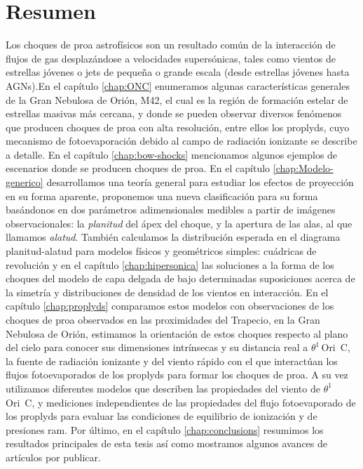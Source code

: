 \documentclass[11pt, twoside]{book}
\newcommand\thC{\(\theta^1\)\,Ori~C} %
\begin{document}
\section*{\centering Resumen}

Los choques de proa astrofísicos son un resultado común de la interacción de flujos de gas desplazándose a velocidades supersónicas, tales como vientos de estrellas jóvenes o jets de pequeña o grande escala (desde estrellas jóvenes hasta AGNs).En el capítulo \ref{chap:ONC} enumeramos algunas características generales de la Gran Nebulosa de Orión, M42, el cual es la región de formación estelar de estrellas masivas más cercana, y donde se pueden observar diversos fenómenos que producen choques de proa con alta resolución, entre ellos los proplyds, cuyo mecanismo de fotoevaporación debido al campo de radiación ionizante se describe a detalle. En el capítulo \ref{chap:bow-shocks} mencionamos algunos ejemplos de escenarios donde se producen choques de proa. En el capítulo \ref{chap:Modelo-generico} desarrollamos una teoría general para estudiar los efectos de proyección en su forma aparente, proponemos una nueva clasificación para su forma basándonos en dos parámetros adimensionales medibles a partir de imágenes observacionales: la \textit{planitud} del ápex del choque, y la apertura de las alas, al que llamamos \textit{alatud}. También calculamos la distribución esperada en el diagrama planitud-alatud para modelos físicos y geométricos simples: cuádricas de revolución y en el capítulo \ref{chap:hipersonica} las soluciones a la forma de los choques del modelo de capa delgada de \citet{Canto:1996} bajo determinadas suposiciones acerca de la simetría y distribuciones de densidad de los vientos en interacción. En el capítulo \ref{chap:proplyds} comparamos estos modelos con observaciones de los choques de proa observados en las proximidades del Trapecio, en la Gran Nebulosa de Orión, estimamos la orientación de estos choques respecto al plano del cielo para conocer sus dimensiones intrínsecas y su distancia real a \thC{}, la fuente de radiación ionizante y del viento rápido con el que interactúan los flujos fotoevaporados de los proplyds para formar los choques de proa. A su vez utilizamos diferentes modelos que describen las propiedades del viento de \thC{}, y mediciones independientes de las propiedades del flujo fotoevaporado de los proplyds para evaluar las condiciones de equilibrio de ionización y de presiones ram.
Por último, en el capítulo \ref{chap:conclusions} resumimos los resultados principales de esta tesis así como mostramos algunos avances de artículos por publicar.
\end{document}
